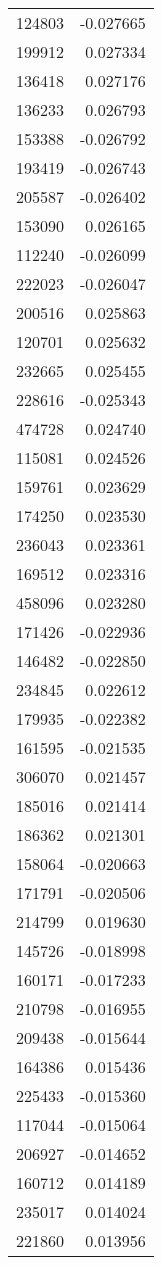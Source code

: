 \begin{tabular}{lr}
124803 & -0.027665 \\
199912 & 0.027334 \\
136418 & 0.027176 \\
136233 & 0.026793 \\
153388 & -0.026792 \\
193419 & -0.026743 \\
205587 & -0.026402 \\
153090 & 0.026165 \\
112240 & -0.026099 \\
222023 & -0.026047 \\
200516 & 0.025863 \\
120701 & 0.025632 \\
232665 & 0.025455 \\
228616 & -0.025343 \\
474728 & 0.024740 \\
115081 & 0.024526 \\
159761 & 0.023629 \\
174250 & 0.023530 \\
236043 & 0.023361 \\
169512 & 0.023316 \\
458096 & 0.023280 \\
171426 & -0.022936 \\
146482 & -0.022850 \\
234845 & 0.022612 \\
179935 & -0.022382 \\
161595 & -0.021535 \\
306070 & 0.021457 \\
185016 & 0.021414 \\
186362 & 0.021301 \\
158064 & -0.020663 \\
171791 & -0.020506 \\
214799 & 0.019630 \\
145726 & -0.018998 \\
160171 & -0.017233 \\
210798 & -0.016955 \\
209438 & -0.015644 \\
164386 & 0.015436 \\
225433 & -0.015360 \\
117044 & -0.015064 \\
206927 & -0.014652 \\
160712 & 0.014189 \\
235017 & 0.014024 \\
221860 & 0.013956 \\

\end{tabular}

